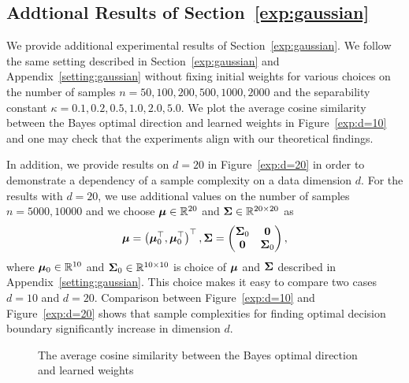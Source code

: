 \subsection{Addtional Results of Section~\ref{exp:gaussian}}\label{result:gaussian}
We provide additional experimental results of Section~\ref{exp:gaussian}. We follow the same setting described in Section~\ref{exp:gaussian} and Appendix~\ref{setting:gaussian} without fixing initial weights for various choices on the number of samples $n = 50,100,200,500,1000,2000$ and the separability constant $\kappa = 0.1,0.2,0.5,1.0,2.0,5.0$. We plot the average cosine similarity between the Bayes optimal direction and learned weights in Figure~\ref{exp:d=10} and one may check that the experiments align with our theoretical findings.

In addition, we provide results on $d=20$ in Figure~\ref{exp:d=20} in order to demonstrate a dependency of a sample complexity on a data dimension $d$.  For the results with $d=20$, we use additional values on the number of samples $n=5000,10000$ and we choose ${\bm{\mu}} \in \mathbb{R}^{20}$ and ${\bm{\Sigma}} \in \mathbb{R}^{20 \times 20}$ as
\begin{equation*}
    {\bm{\mu}} = \left({\bm{\mu}}_0^\top, {\bm{\mu}}_0^\top\right)^\top,  {\bm{\Sigma}} = \begin{pmatrix}
{\bm{\Sigma}}_0 & {\bm{0}} \\
{\bm{0}} &{\bm{\Sigma}}_0 
\end{pmatrix}, 
\end{equation*}
where ${\bm{\mu}}_0 \in \mathbb{R}^{10}$ and ${\bm{\Sigma}}_0 \in \mathbb{R}^{10 \times 10}$ is choice of ${\bm{\mu}}$ and ${\bm{\Sigma}}$ described in Appendix~\ref{setting:gaussian}. This choice makes it easy to compare two cases $d=10$ and $d=20$. Comparison between Figure~\ref{exp:d=10} and Figure~\ref{exp:d=20} shows that sample complexities for finding optimal decision boundary significantly increase in dimension $d$.

\begin{figure}[h]
\centering
    \begin{subfigure}[$d=10$]
    {
    \centering
    \texttt{[image: Heat\_Map.pdf]}
    \label{exp:d=10}
    }
    \end{subfigure}
    \begin{subfigure}[$d=20$]
    {
    \centering
    \texttt{[image: Heat\_Map\_highdim.pdf]}
    \label{exp:d=20}
    }
    \end{subfigure}
    \caption{The average cosine similarity between the Bayes optimal direction and learned weights}
\end{figure}

